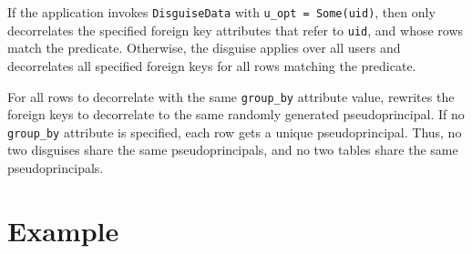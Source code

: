 %
If the application invokes \texttt{DisguiseData} with \texttt{u\_opt = Some(uid)}, then \sys only decorrelates the specified
foreign key attributes that refer to \texttt{uid}, and whose
rows match the predicate. 
%
Otherwise, the disguise applies over all users and \sys decorrelates all
specified foreign keys for all rows matching the predicate.
%

%
For all rows to decorrelate with the same \texttt{group\_by} attribute value,
\sys rewrites the foreign keys to decorrelate to the same randomly generated
pseudoprincipal.
%
If no \texttt{group\_by} attribute is specified, each row gets a unique
pseudoprincipal.
%
Thus, no two disguises share the same pseudoprincipals, and no two tables share
the same pseudoprincipals.
%

\section{Example}
   
